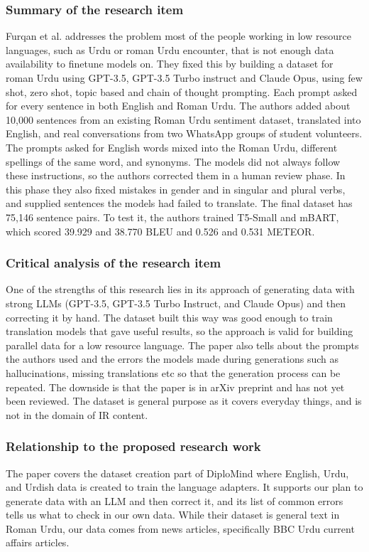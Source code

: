 \documentclass{FastFyp}
\begin{document}
\subsubsection{Summary of the research item}
Furqan et al. \cite{furqan2024erupd} addresses the problem most of the people working in low resource languages, such as Urdu or roman Urdu encounter, that is not enough data availability to finetune models on. They fixed this by building a dataset for roman Urdu using GPT-3.5, GPT-3.5 Turbo instruct and Claude Opus, using few shot, zero shot, topic based and chain of thought prompting. Each prompt asked for every sentence in both English and Roman Urdu. The authors added about 10,000 sentences from an existing Roman Urdu sentiment dataset, translated into English, and real conversations from two WhatsApp groups of student volunteers. The prompts asked for English words mixed into the Roman Urdu, different spellings of the same word, and synonyms. The models did not always follow these instructions, so the authors corrected them in a human review phase. In this phase they also fixed mistakes in gender and in singular and plural verbs, and supplied sentences the models had failed to translate. The final dataset has 75,146 sentence pairs. To test it, the authors trained T5-Small and mBART, which scored 39.929 and 38.770 BLEU and 0.526 and 0.531 METEOR.

\subsubsection{Critical analysis of the research item}
One of the strengths of this research lies in its approach of generating data with strong LLMs (GPT-3.5, GPT-3.5 Turbo Instruct, and Claude Opus) and then correcting it by hand. The dataset built this way was good enough to train translation models that gave useful results, so the approach is valid for building parallel data for a low resource language. The paper also tells about the prompts the authors used and the errors the models made during generations such as hallucinations, missing translations etc so that the generation process can be repeated. The downside is that the paper is in arXiv preprint and has not yet been reviewed. The dataset is general purpose as it covers everyday things, and is not in the domain of IR content.

\subsubsection{Relationship to the proposed research work}
The paper covers the dataset creation part of DiploMind where English, Urdu, and Urdish data is created to train the language adapters. It supports our plan to generate data with an LLM and then correct it, and its list of common errors tells us what to check in our own data. While their dataset is general text in Roman Urdu, our data comes from news articles, specifically BBC Urdu current affairs articles.
\end{document}

